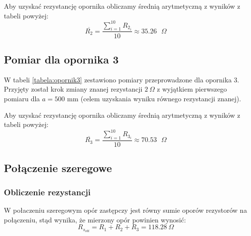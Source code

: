 \documentclass[a4paper,12pts]{article}
\begin{document}
	Aby uzyskać rezystancję opornika obliczamy średnią arytmetyczną z wyników z tabeli powyżej:
	\begin{equation}
	\overline{R_2} = \frac{\sum_{i = 1}^{10} R_{2_i}}{10} \approx 35.26 \textrm{ $\Omega$}
	\end{equation}
	
	
	\subsection{Pomiar dla opornika 3}
	W tabeli \ref{tabela:opornik3} zestawiono pomiary przeprowadzone dla opornika 3. Przyjęty został krok zmiany znanej rezystancji $2 ~\Omega$ z wyjątkiem pierwszego pomiaru dla $a = 500$ mm (celem uzyskania wyniku równego rezystancji znanej).
	
	\begin{table}[!h]
		\centering
		\caption{Wyniki pomiarów dla opornika nr 3}
		\label{tabela:opornik3}
	\end{table}
	
	Aby uzyskać rezystancję opornika obliczamy średnią arytmetyczną z wyników z tabeli powyżej:
	\begin{equation}
	\overline{R_3} = \frac{\sum_{i = 1}^{10} R_{3_i}}{10} \approx 70.53 \textrm{ $\Omega$}
	\end{equation}
	
	
	\subsection{Połączenie szeregowe}
	\subsubsection{Obliczenie rezystancji}
	W połaczeniu szeregowym opór zastępczy jest równy sumie oporów rezystorów na połączeniu, stąd wynika, że mierzony opór powinien wynosić:
	\begin{equation}
		R_{s_{obl}} = R_1 + R_2 + R_3 = 118.28~\Omega
	\end{equation}
	
\end{document}
